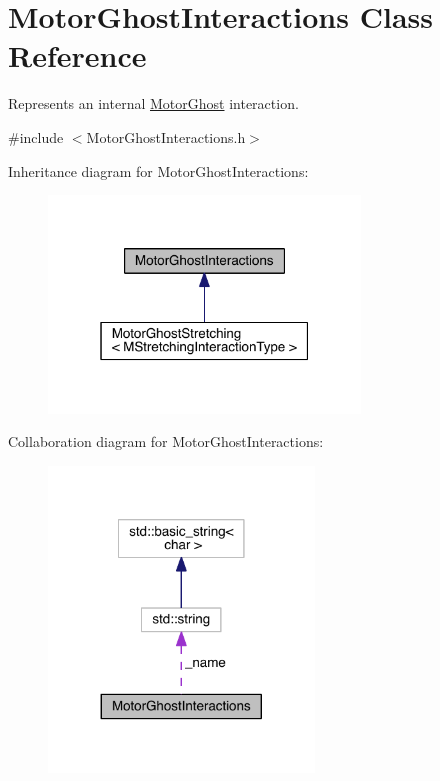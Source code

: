 \hypertarget{classMotorGhostInteractions}{\section{Motor\+Ghost\+Interactions Class Reference}
\label{classMotorGhostInteractions}
}


Represents an internal \hyperlink{classMotorGhost}{Motor\+Ghost} interaction.  




{\ttfamily \#include $<$Motor\+Ghost\+Interactions.\+h$>$}



Inheritance diagram for Motor\+Ghost\+Interactions\+:
\nopagebreak
\begin{figure}[H]
\begin{center}
\leavevmode
\includegraphics[width=235pt]{classMotorGhostInteractions__inherit__graph}
\end{center}
\end{figure}


Collaboration diagram for Motor\+Ghost\+Interactions\+:\nopagebreak
\begin{figure}[H]
\begin{center}
\leavevmode
\includegraphics[width=200pt]{classMotorGhostInteractions__coll__graph}
\end{center}
\end{figure}
